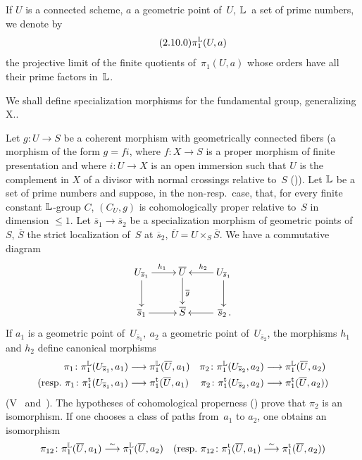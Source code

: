 \subsection{}
\label{XIII.2.10}
If $U$ is a connected scheme, $a$ a geometric point
of~$U$, $\mathbb{L}$~a set of prime numbers, we denote by
\begin{equation*}
\label{eq:XIII.2.10.0}
\tag{2.10.0} \pi_1^{\mathbb{L}}(U,a)
\end{equation*}
the projective limit of the finite quotients of~$\pi_1(U,a)$ whose
orders have all their prime factors in~$\mathbb{L}$.

We shall define specialization morphisms for the
fundamental group, generalizing X..

Let $g\colon U\to S$ be a coherent morphism with geometrically
connected fibers (\resp a morphism of the form $g=
fi$, where $f\colon X \to S$ is a proper morphism of
finite presentation and where $i\colon U\to X$ is an
open immersion such that $U$ is the complement in $X$
of a divisor with normal crossings relative to~$S$
(\cf {})). Let ${\mathbb{L}}$ be a set of prime numbers and
suppose, in the non-resp.\ case, that, for every finite constant
${\mathbb{L}}$-group $C$, $(C_U,g)$ is cohomologically proper
relative to~$S$ in dimension $\leq 1$. Let $\overline{s}_1
\to \overline{s}_2$ be a specialization morphism of
geometric points of~$S$, $\overline{S}$ the strict
localization of~$S$ at $\overline{s}_2$,
$\overline{U}=U\times_S\overline{S}$. We have a commutative diagram
$$
\xymatrix{ U_{\bar{s}_1} \ar[r]^{h_1} \ar[d] & \bar{U}
\ar[d]^{\bar{g}} & U_{\bar{s}_1} \ar[l]_{h_2} \ar[d] \\ \bar{s}_1
\ar[r] & \bar{S} & \,\bar{s}_2\,. \ar[l] }
$$
If $a_1$ is a geometric point of~$U_{\bar{s}_1},\ a_2$ a
geometric point of~$U_{\bar{s}_2}$, the morphisms $h_1$ and
$h_2$ define canonical morphisms
\begin{align*}
\pi_1\colon \pi_1^{\LL}(U_{\bar{s}_1},a_1)&\to
\pi_1^{\LL}(\bar{U},a_1) & \pi_2\colon
\pi_1^{\LL}(U_{\bar{s}_2},a_2)&\to \pi_1^{\LL}(\bar{U},a_2)\\
(\text{\resp~} \pi_1\colon \pi_1^\tame (U_{\bar{s}_1},a_1)&\to
\pi_1^\tame (\bar{U},a_1) & \pi_2\colon
\pi_1^\tame(U_{\bar{s}_2},a_2)&\to \pi_1^\tame(\bar{U},a_2))
\end{align*}
(V~ and~). The hypotheses of
cohomological properness (\resp {}) prove that $\pi_2$
is an isomorphism. If one chooses a class of paths from~$a_1$
to $a_2$, one obtains an isomorphism
$$
\pi_{12}\colon \pi_1^{\LL}(\bar{U},a_1)\isomto
\pi_1^{\LL}(\bar{U},a_2) \quad (\text{\resp~} \pi_{12}\colon
\pi_1^\tame (\bar{U},a_1)\isomto \pi_1^\tame(\bar{U},a_2))
$$
